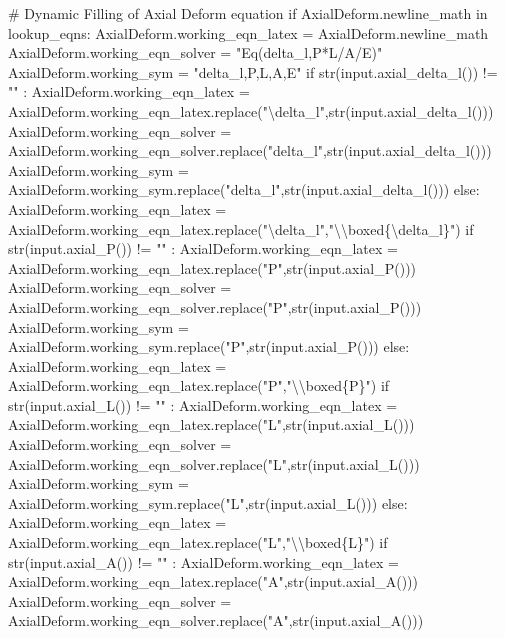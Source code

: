 \documentclass[
  letterpaper,
  DIV=11,
  numbers=noendperiod]{scrreprt}
\newenvironment{Shaded}{\begin{snugshade}}{\end{snugshade}}
\newcommand{\NormalTok}[1]{\textcolor[rgb]{0.00,0.23,0.31}{#1}}
\begin{document}
\begin{Shaded}
\begin{Highlighting}[]
                
\NormalTok{        \# Dynamic Filling of Axial Deform equation }
\NormalTok{        if AxialDeform.newline\_math in lookup\_eqns:}
\NormalTok{            AxialDeform.working\_eqn\_latex = AxialDeform.newline\_math}
\NormalTok{            AxialDeform.working\_eqn\_solver = "Eq(delta\_l,P*L/A/E)"}
\NormalTok{            AxialDeform.working\_sym = "delta\_l,P,L,A,E"}
\NormalTok{            if str(input.axial\_delta\_l()) != "" : }
\NormalTok{                AxialDeform.working\_eqn\_latex = AxialDeform.working\_eqn\_latex.replace("\textbackslash{}delta\_l",str(input.axial\_delta\_l()))}
\NormalTok{                AxialDeform.working\_eqn\_solver = AxialDeform.working\_eqn\_solver.replace("delta\_l",str(input.axial\_delta\_l()))}
\NormalTok{                AxialDeform.working\_sym = AxialDeform.working\_sym.replace("delta\_l",str(input.axial\_delta\_l()))}
\NormalTok{            else:}
\NormalTok{                AxialDeform.working\_eqn\_latex = AxialDeform.working\_eqn\_latex.replace("\textbackslash{}delta\_l","\textbackslash{}\textbackslash{}boxed\{\textbackslash{}delta\_l\}")}
\NormalTok{            if str(input.axial\_P()) != "" : }
\NormalTok{                AxialDeform.working\_eqn\_latex = AxialDeform.working\_eqn\_latex.replace("P",str(input.axial\_P()))}
\NormalTok{                AxialDeform.working\_eqn\_solver = AxialDeform.working\_eqn\_solver.replace("P",str(input.axial\_P()))}
\NormalTok{                AxialDeform.working\_sym = AxialDeform.working\_sym.replace("P",str(input.axial\_P()))}
\NormalTok{            else:}
\NormalTok{                AxialDeform.working\_eqn\_latex = AxialDeform.working\_eqn\_latex.replace("P","\textbackslash{}\textbackslash{}boxed\{P\}")}
\NormalTok{            if str(input.axial\_L()) != "" : }
\NormalTok{                AxialDeform.working\_eqn\_latex = AxialDeform.working\_eqn\_latex.replace("L",str(input.axial\_L()))}
\NormalTok{                AxialDeform.working\_eqn\_solver = AxialDeform.working\_eqn\_solver.replace("L",str(input.axial\_L()))}
\NormalTok{                AxialDeform.working\_sym = AxialDeform.working\_sym.replace("L",str(input.axial\_L()))}
\NormalTok{            else:}
\NormalTok{                AxialDeform.working\_eqn\_latex = AxialDeform.working\_eqn\_latex.replace("L","\textbackslash{}\textbackslash{}boxed\{L\}")}
\NormalTok{            if str(input.axial\_A()) != "" : }
\NormalTok{                AxialDeform.working\_eqn\_latex = AxialDeform.working\_eqn\_latex.replace("A",str(input.axial\_A()))}
\NormalTok{                AxialDeform.working\_eqn\_solver = AxialDeform.working\_eqn\_solver.replace("A",str(input.axial\_A()))}

\end{Highlighting}
\end{Shaded}
\end{document}

